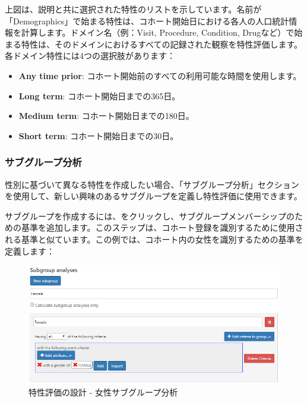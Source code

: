 \documentclass[
  11pt]{book}
\providecommand{\tightlist}{%
  \setlength{\itemsep}{0pt}\setlength{\parskip}{0pt}}
\theoremstyle{definition}
\theoremstyle{definition}
\theoremstyle{definition}
\theoremstyle{definition}
\theoremstyle{remark}
\begin{document}
上図は、説明と共に選択された特性のリストを示しています。名前が「Demographics」で始まる特性は、コホート開始日における各人の人口統計情報を計算します。ドメイン名（例：Visit, Procedure, Condition, Drugなど）で始まる特性は、そのドメインにおけるすべての記録された観察を特性評価します。各ドメイン特性には4つの選択肢があります：

\begin{itemize}
\tightlist
\item
  \textbf{Any time prior}: コホート開始前のすべての利用可能な時間を使用します。
\item
  \textbf{Long term}: コホート開始日までの365日。
\item
  \textbf{Medium term}: コホート開始日までの180日。
\item
  \textbf{Short term}: コホート開始日までの30日。
\end{itemize}

\subsubsection*{サブグループ分析}\label{ux30b5ux30d6ux30b0ux30ebux30fcux30d7ux5206ux6790}

性別に基づいて異なる特性を作成したい場合、「サブグループ分析」セクションを使用して、新しい興味のあるサブグループを定義し特性評価に使用できます。

サブグループを作成するには、をクリックし、サブグループメンバーシップのための基準を追加します。このステップは、コホート登録を識別するために使用される基準と似ています。この例では、コホート内の女性を識別するための基準を定義します：

\begin{figure}

{\centering \includegraphics[width=1\linewidth]{images/Characterization/atlasCharacterizationSubgroup} 

}

\caption{特性評価の設計 - 女性サブグループ分析}\label{fig:atlasCharacterizationSubgroup}
\end{figure}
\end{document}
